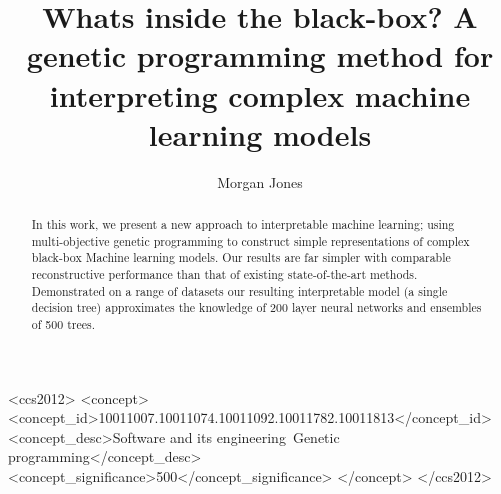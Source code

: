 \documentclass[sigconf]{acmart}
\begin{document}
\title[What\textquotesingle s inside the black-box? A GP method for interpreting complex ML models]{What\textquotesingle s inside the black-box? A genetic programming method for interpreting complex machine learning models}

\author{Morgan Jones}


\begin{abstract}
In this work, we present a new approach to interpretable machine learning; using multi-objective genetic programming to construct simple representations of complex black-box Machine learning models.
Our results are far simpler with comparable reconstructive performance than that of existing state-of-the-art methods.  Demonstrated on a range of datasets our resulting interpretable model (a single decision tree) approximates the knowledge of 200 layer neural networks and ensembles of 500 trees.
\end{abstract}

%
%
\begin{CCSXML}
<ccs2012>
<concept>
<concept_id>10011007.10011074.10011092.10011782.10011813</concept_id>
<concept_desc>Software and its engineering~Genetic programming</concept_desc>
<concept_significance>500</concept_significance>
</concept>
</ccs2012>
\end{CCSXML}



\maketitle




 
\end{document}
